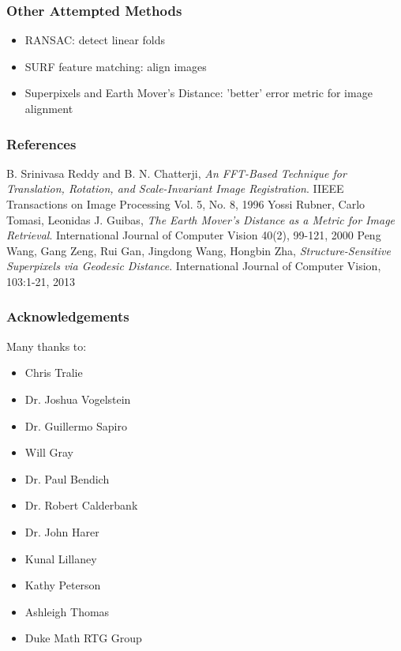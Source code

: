 \documentclass{beamer}
\begin{document}
\begin{frame}
\frametitle{Other Attempted Methods}
\begin{itemize}
\item RANSAC: detect linear folds
\item SURF feature matching: align images
\item Superpixels and Earth Mover's Distance: 'better' error metric for image alignment
\end{itemize}
\end{frame}

\begin{frame}
\frametitle{References}
\begin{thebibliography}{9}
	B. Srinivasa Reddy and B. N. Chatterji,
	\emph{An FFT-Based Technique for Translation, Rotation, and Scale-Invariant Image Registration}.
	IIEEE Transactions on Image Processing Vol. 5, No. 8, 1996
	Yossi Rubner, Carlo Tomasi, Leonidas J. Guibas,
	\emph{The Earth Mover's Distance as a Metric for Image Retrieval}.
	International Journal of Computer Vision 40(2), 99-121, 2000
	Peng Wang, Gang Zeng, Rui Gan, Jingdong Wang, Hongbin Zha,
	\emph{Structure-Sensitive Superpixels via Geodesic Distance}.
	International Journal of Computer Vision, 103:1-21, 2013
\end{thebibliography} 
\end{frame}

\begin{frame}
\frametitle{Acknowledgements}
Many thanks to:
\begin{itemize}
\item Chris Tralie
\item Dr. Joshua Vogelstein
\item Dr. Guillermo Sapiro
\item Will Gray 
\item Dr. Paul Bendich 
\item Dr. Robert Calderbank
\item Dr. John Harer
\item Kunal Lillaney
\item Kathy Peterson 
\item Ashleigh Thomas 
\item Duke Math RTG Group 
\end{itemize}
\end{frame}
\end{document}
